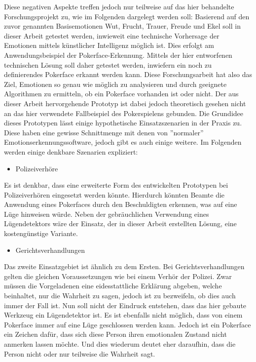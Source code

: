 \documentclass[12pt, a4paper]{report}
\begin{document}
Diese negativen Aspekte treffen jedoch nur teilweise auf das hier behandelte Forschungsprojekt zu, wie im Folgenden dargelegt werden soll:
Basierend auf den zuvor genannten Basisemotionen Wut, Frucht, Trauer, Freude und Ekel soll in dieser Arbeit getestet werden, inwieweit eine technische Vorhersage der Emotionen mittels künstlicher Intelligenz möglich ist. Dies erfolgt am Anwendungsbeispiel der Pokerface-Erkennung. Mittels der hier entworfenen technischen Lösung soll daher getestet werden, inwiefern ein noch zu definierendes Pokerface erkannt werden kann. Diese Forschungsarbeit hat also das Ziel, Emotionen so genau wie möglich zu analysieren und durch geeignete Algorithmen zu ermitteln, ob ein Pokerface vorhanden ist oder nicht. Der aus dieser Arbeit hervorgehende Prototyp ist dabei jedoch theoretisch gesehen nicht an das hier verwendete Fallbeispiel des Pokerspielens gebunden. Die Grundidee dieses Prototypen lässt einige hypothetische Einsatzszenarien in der Praxis zu. Diese haben eine gewisse Schnittmenge mit denen von ''normaler'' Emotionserkennungssoftware, jedoch gibt es auch einige weitere. Im Folgenden werden
einige denkbare Szenarien expliziert:
\begin{itemize}
	\item{Polizeiverhöre}
\end{itemize}
Es ist denkbar, dass eine erweiterte Form des entwickelten Prototypen bei Polizeiverhören eingesetzt werden könnte. Hierdurch könnten Beamte die Anwendung eines Pokerfaces durch den Beschuldigten erkennen, was auf eine Lüge hinweisen würde. Neben der gebräuchlichen Verwendung eines Lügendetektors wäre der Einsatz, der in dieser Arbeit erstellten Lösung, eine kostengünstige Variante.
\begin{itemize}
	\item{Gerichtsverhandlungen}
\end{itemize}
Das zweite Einsatzgebiet ist ähnlich zu dem Ersten. Bei Gerichtsverhandlungen gelten die gleichen Voraussetzungen wie bei einem Verhör der Polizei. Zwar müssen die Vorgeladenen eine eidesstattliche Erklärung abgeben, welche beinhaltet, nur die Wahrheit zu sagen, jedoch ist zu bezweifeln, ob dies auch immer der Fall ist.
Nun soll nicht der Eindruck entstehen, dass das hier gebaute Werkzeug ein Lügendetektor ist. Es ist ebenfalls nicht möglich, dass von einem Pokerface immer auf eine Lüge geschlossen werden kann. Jedoch ist ein Pokerface ein Zeichen dafür, dass sich diese Person ihren emotionalen Zustand nicht anmerken lassen möchte. Und dies wiederum deutet eher daraufhin, dass die Person nicht oder nur teilweise die Wahrheit sagt.
\end{document}
